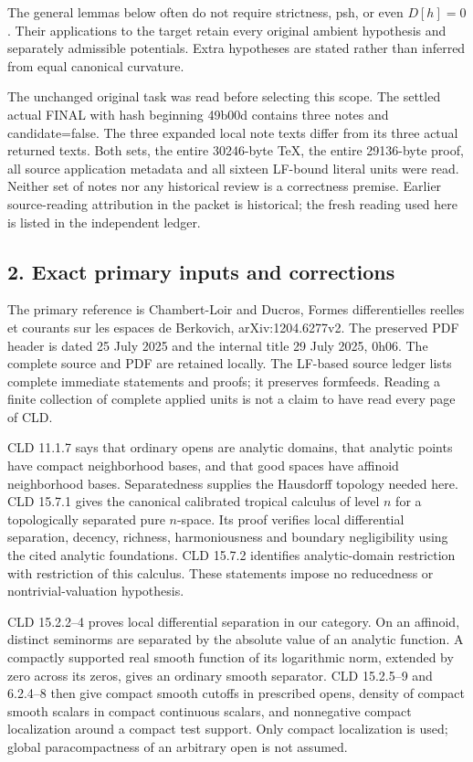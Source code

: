 \documentclass[11pt]{article}
\begin{document}
The general lemmas below often do not require strictness, psh, or even \(D[h]=0\). Their applications to the target retain every original ambient hypothesis and separately admissible potentials. Extra hypotheses are stated rather than inferred from equal canonical curvature.

The unchanged original task was read before selecting this scope. The settled actual FINAL with hash beginning 49b00d contains three notes and candidate=false. The three expanded local note texts differ from its three actual returned texts. Both sets, the entire 30246-byte TeX, the entire 29136-byte proof, all source application metadata and all sixteen LF-bound literal units were read. Neither set of notes nor any historical review is a correctness premise. Earlier source-reading attribution in the packet is historical; the fresh reading used here is listed in the independent ledger.

\subsection{2. Exact primary inputs and corrections}

The primary reference is Chambert-Loir and Ducros, Formes differentielles reelles et courants sur les espaces de Berkovich, arXiv:1204.6277v2. The preserved PDF header is dated 25 July 2025 and the internal title 29 July 2025, 0h06. The complete source and PDF are retained locally. The LF-based source ledger lists complete immediate statements and proofs; it preserves formfeeds. Reading a finite collection of complete applied units is not a claim to have read every page of CLD.

CLD 11.1.7 says that ordinary opens are analytic domains, that analytic points have compact neighborhood bases, and that good spaces have affinoid neighborhood bases. Separatedness supplies the Hausdorff topology needed here. CLD 15.7.1 gives the canonical calibrated tropical calculus of level \(n\) for a topologically separated pure \(n\)-space. Its proof verifies local differential separation, decency, richness, harmoniousness and boundary negligibility using the cited analytic foundations. CLD 15.7.2 identifies analytic-domain restriction with restriction of this calculus. These statements impose no reducedness or nontrivial-valuation hypothesis.

CLD 15.2.2--4 proves local differential separation in our category. On an affinoid, distinct seminorms are separated by the absolute value of an analytic function. A compactly supported real smooth function of its logarithmic norm, extended by zero across its zeros, gives an ordinary smooth separator. CLD 15.2.5--9 and 6.2.4--8 then give compact smooth cutoffs in prescribed opens, density of compact smooth scalars in compact continuous scalars, and nonnegative compact localization around a compact test support. Only compact localization is used; global paracompactness of an arbitrary open is not assumed.
\end{document}
